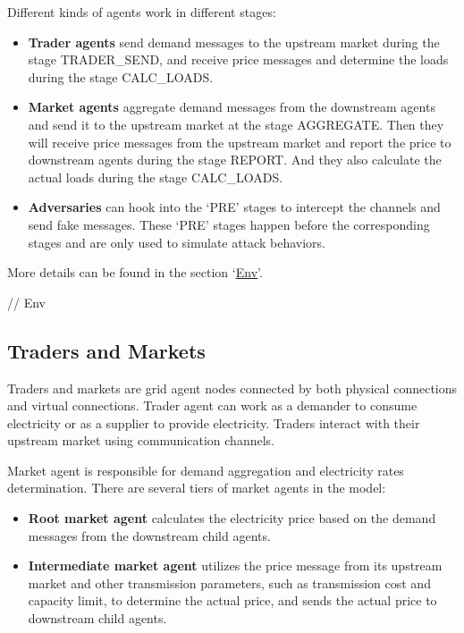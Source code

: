 \documentclass[12pt]{article}
\begin{document}
Different kinds of agents work in different stages: 
\begin{itemize} 
    \item{\textbf{Trader agents}} send demand messages to the upstream market during the stage TRADER\_SEND, 
    and receive price messages and determine the loads during the stage CALC\_LOADS. 
    \item{\textbf{Market agents}} aggregate demand messages from the downstream agents and 
    send it to the upstream market at the stage AGGREGATE. 
    Then they will receive price messages from the upstream market and report the price to downstream agents 
    during the stage REPORT. 
    And they also calculate the actual loads during the stage CALC\_LOADS.
    \item{\textbf{Adversaries}} can hook into the `PRE' stages to intercept the channels and send fake messages. 
    These `PRE' stages happen before the corresponding stages and are only used to simulate attack behaviors.
\end{itemize}

More details can be found in the section `\hyperref[subsec:objects_env]{Env}'. 

// Env

\subsection{Traders and Markets} \mbox{}

Traders and markets are grid agent nodes connected by both physical connections and virtual connections. 
Trader agent can work as a demander to consume electricity or as a supplier to provide electricity. 
Traders interact with their upstream market using communication channels. 

Market agent is responsible for demand aggregation and electricity rates determination. 
There are several tiers of market agents in the model: 
\begin{itemize}
    \item{\textbf{Root market agent}} calculates the electricity price based on the demand messages 
    from the downstream child agents. 
    \item{\textbf{Intermediate market agent}} utilizes the price message from its upstream market and 
    other transmission parameters, such as transmission cost and capacity limit, 
    to determine the actual price, and sends the actual price to downstream child agents.  
\end{itemize}
\end{document}

